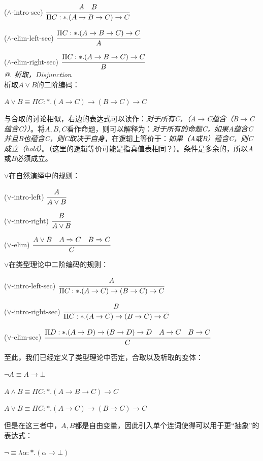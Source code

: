 \documentclass[UTF8]{article}
\makeatletter
\newcommand{\Rmnum}[1]{\expandafter\@slowromancap\romannumeral #1@}
\makeatother
\begin{document}
		($\land$-intro-sec) $\cfrac{A\ \ \ B}{\Pi C:*.(A\rightarrow B\rightarrow C)\rightarrow C}$ 
		
		($\land$-elim-left-sec) $\cfrac{\Pi C:*.(A\rightarrow B\rightarrow C)\rightarrow C}{A}$
		
		($\land$-elim-right-sec) $\cfrac{\Pi C:*.(A\rightarrow B\rightarrow C)\rightarrow C}{B}$ \\
		
	\noindent
	\textit{\Rmnum{2}. 析取，Disjunction}\\
	析取$A\lor B$的二阶编码：
	
		$A\lor B\equiv\Pi C:*.(A\rightarrow C)\rightarrow(B\rightarrow C)\rightarrow C$
		
		与合取的讨论相似，右边的表达式可以读作：\textit{对于所有C，（A$\rightarrow$C蕴含（B$\rightarrow$C蕴含C））}。将$A,B,C$看作命题，则可以解释为：\textit{对于所有的命题C，如果A蕴含C并且B也蕴含C，则C取决于自身}，在逻辑上等价于：\textit{如果（A或B）蕴含C，则C成立（hold）}。（这里的逻辑等价可能是指真值表相同？）。条件是多余的，所以$A$或$B$必须成立。
		
		$\lor$在自然演绎中的规则：
		
		($\lor$-intro-left) $\cfrac{A}{A\lor B}$
		
		($\lor$-intro-right) $\cfrac{B}{A\lor B}$
		
		($\lor$-elim) $\cfrac{A\lor B\ \ \ A\Rightarrow C\ \ \ B\Rightarrow C}{C}$
		
		$\lor$在类型理论中二阶编码的规则：
		
		($\lor$-intro-left-sec) $\cfrac{A}{\Pi C:*.(A\rightarrow C)\rightarrow(B\rightarrow C)\rightarrow C}$
		
		($\lor$-intro-right-sec) $\cfrac{B}{\Pi C:*.(A\rightarrow C)\rightarrow(B\rightarrow C)\rightarrow C}$
		
		($\lor$-elim-sec) $\cfrac{\Pi D:*.(A\rightarrow D)\rightarrow(B\rightarrow D)\rightarrow D\ \ \ A\rightarrow C\ \ \ B\rightarrow C}{C}$
		
		至此，我们已经定义了类型理论中否定，合取以及析取的变体：
		
		$\neg A\equiv A\rightarrow\bot$
		
		$A\land B\equiv\Pi C:*.(A\rightarrow B\rightarrow C)\rightarrow C$
		
		$A\lor B\equiv\Pi C:*.(A\rightarrow C)\rightarrow(B\rightarrow C)\rightarrow C$
		
		但是在这三者中，$A,B$都是自由变量，因此引入单个连词使得可以用于更“抽象”的表达式：
		
		$\neg\equiv\lambda\alpha:*.(\alpha\rightarrow\bot)$
		
\end{document}
